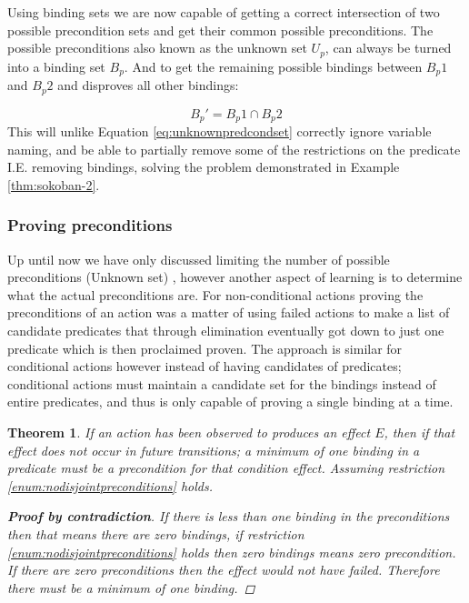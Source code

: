 \documentclass[../Master.tex]{subfiles}
\begin{document}
Using binding sets we are now capable of getting a correct intersection of two possible precondition sets and get their common possible preconditions. The possible preconditions also known as the unknown set $U_p$, can always be turned into a binding set $B_p$. 
And to get the remaining possible bindings between $B_p1$ and $B_p2$ and disproves all other bindings:
 
\begin{equation}
B_p' = B_p1 \cap B_p2
\end{equation}
This will unlike Equation \ref{eq:unknownpredcondset} correctly ignore variable naming, and be able to partially remove some of the restrictions on the predicate I.E. removing bindings, solving the problem demonstrated in Example \ref{thm:sokoban-2}.

\subsubsection{Proving preconditions}
Up until now we have only discussed limiting the number of possible preconditions (Unknown set) , however another aspect of learning is to determine what the actual preconditions are. 
For non-conditional actions proving the preconditions of an action was a matter of using failed actions to make a list of candidate predicates that through elimination eventually got down to just one predicate which is then proclaimed proven. The approach is similar for conditional actions however instead of having candidates of predicates; conditional actions must maintain a candidate set for the bindings instead of entire predicates, and thus is only capable of proving a single binding at a time. 

\newtheorem{thm-minimum-one-binding}{Theorem}
\begin{thm-minimum-one-binding}\label{thm:minimum-one-binding}
	If an action has been observed to produces an effect $E$, then if that effect does not occur in future transitions; 
	a minimum of one binding in a predicate must be a precondition for that condition effect. Assuming restriction \ref{enum:nodisjointpreconditions} holds.
	
	\begin{proof}[\textbf{Proof by contradiction}] If there is less than one binding in the preconditions then that means there are zero bindings, if restriction \ref{enum:nodisjointpreconditions} holds then zero bindings means zero precondition. If there are zero preconditions then the effect would not have failed. Therefore there must be a minimum of one binding. \qedhere
	\end{proof}
\end{thm-minimum-one-binding}
\end{document}
